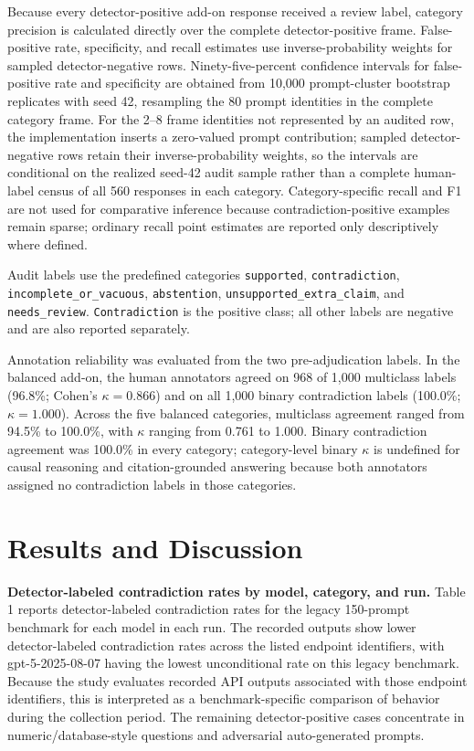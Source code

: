 \documentclass[11pt]{article}
\newcommand{\code}[1]{\texttt{#1}}
\begin{document}
Because every detector-positive add-on response received a review label, category precision is calculated directly over the complete detector-positive frame. False-positive rate, specificity, and recall estimates use inverse-probability weights for sampled detector-negative rows. Ninety-five-percent confidence intervals for false-positive rate and specificity are obtained from 10,000 prompt-cluster bootstrap replicates with seed 42, resampling the 80 prompt identities in the complete category frame. For the 2--8 frame identities not represented by an audited row, the implementation inserts a zero-valued prompt contribution; sampled detector-negative rows retain their inverse-probability weights, so the intervals are conditional on the realized seed-42 audit sample rather than a complete human-label census of all 560 responses in each category. Category-specific recall and F1 are not used for comparative inference because contradiction-positive examples remain sparse; ordinary recall point estimates are reported only descriptively where defined.

Audit labels use the predefined categories \code{supported}, \code{contradiction}, \code{incomplete\_or\_vacuous}, \code{abstention}, \code{unsupported\_extra\_claim}, and \code{needs\_review}. \code{Contradiction} is the positive class; all other labels are negative and are also reported separately.

Annotation reliability was evaluated from the two pre-adjudication labels. In the balanced add-on, the human annotators agreed on 968 of 1,000 multiclass labels (96.8\%; Cohen's $\kappa=0.866$) and on all 1,000 binary contradiction labels (100.0\%; $\kappa=1.000$). Across the five balanced categories, multiclass agreement ranged from 94.5\% to 100.0\%, with $\kappa$ ranging from 0.761 to 1.000. Binary contradiction agreement was 100.0\% in every category; category-level binary $\kappa$ is undefined for causal reasoning and citation-grounded answering because both annotators assigned no contradiction labels in those categories.

\section*{Results and Discussion}
\textbf{Detector-labeled contradiction rates by model, category, and run.} Table 1 reports detector-labeled contradiction rates for the legacy 150-prompt benchmark for each model in each run. The recorded outputs show lower detector-labeled contradiction rates across the listed endpoint identifiers, with gpt-5-2025-08-07 having the lowest unconditional rate on this legacy benchmark. Because the study evaluates recorded API outputs associated with those endpoint identifiers, this is interpreted as a benchmark-specific comparison of behavior during the collection period. The remaining detector-positive cases concentrate in numeric/database-style questions and adversarial auto-generated prompts.
\end{document}
